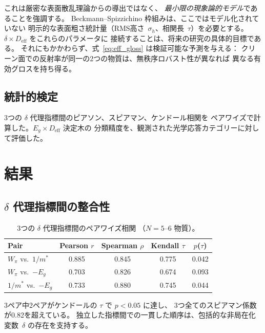 \documentclass[twocolumn,showpacs,preprintnumbers,amsmath,amssymb,prb]{revtex4-2}
\begin{document}
これは厳密な表面散乱理論からの導出ではなく、
\emph{最小限の現象論的モデル}であることを強調する。
Beckmann--Spizzichino 枠組みは、ここではモデル化されていない
明示的な表面粗さ統計量（RMS高さ~$\sigma_h$、相関長~$\tau$）を必要とする。
$\delta \times D_\mathrm{eff}$ をこれらのパラメータに
接続することは、将来の研究の具体的目標である。
それにもかかわらず、式~\ref{eq:eff_gloss} は検証可能な予測を与える：
クリーン面での反射率が同一の2つの物質は、無秩序ロバスト性が異なれば
異なる有効グロスを持ち得る。

\subsection{統計的検定}

3つの $\delta$ 代理指標間のピアソン、スピアマン、ケンドール相関を
ペアワイズで計算した。$E_g \times D_\mathrm{eff}$ 決定木の
分類精度を、観測された光学応答カテゴリーに対して評価した。

\section{結果}
\label{sec:results}

\subsection{$\delta$ 代理指標間の整合性}

\begin{table}[h]
\caption{3つの $\delta$ 代理指標間のペアワイズ相関
  （$N = 5$--$6$ 物質）。}
\label{tab:correlations}
\begin{ruledtabular}
\begin{tabular}{lcccc}
  Pair & Pearson $r$ & Spearman $\rho$ & Kendall $\tau$ & $p$($\tau$) \\
  \hline
  $W_\pi$ vs.\ $1/m^*$ & 0.885 & 0.845 & 0.775 & 0.042 \\
  $W_\pi$ vs.\ $-E_g$ & 0.703 & 0.826 & 0.674 & 0.093 \\
  $1/m^*$ vs.\ $-E_g$ & 0.733 & 0.880 & 0.745 & 0.044 \\
\end{tabular}
\end{ruledtabular}
\end{table}

3ペア中2ペアがケンドールの $\tau$ で $p < 0.05$ に達し、
3つ全てのスピアマン係数が0.82を超えている。
独立した指標間での一貫した順序は、包括的な非局在化変数~$\delta$
の存在を支持する。
\end{document}
